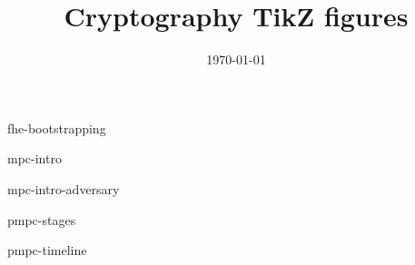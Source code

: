 \documentclass{beamer}
\title{Cryptography TikZ figures}
\date{\today}
\begin{document}
\frame{\titlepage}


\begin{frame}{fhe-bootstrapping}
\vspace{0.2em}
\hspace*{-2.4em}
\centering

\end{frame}


\begin{frame}{mpc-intro}
\centering

\end{frame}


\begin{frame}{mpc-intro-adversary}
\centering

\end{frame}


\begin{frame}{pmpc-stages}
\centering

\end{frame}


\begin{frame}{pmpc-timeline}
\centering

\end{frame}
\end{document}
